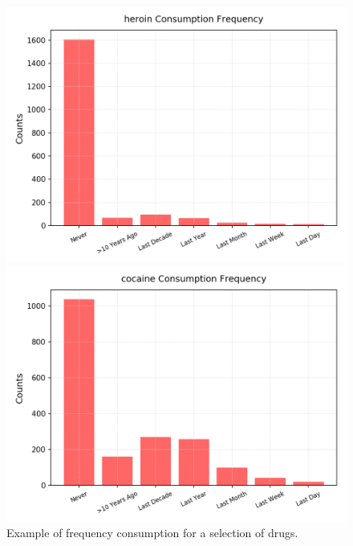 \documentclass{article}
\begin{document}
\begin{figure}[h!]
\begin{minipage}[b]{0.32\textwidth}
\end{minipage}
\begin{minipage}[b]{0.32\textwidth}
	\includegraphics[width=\textwidth]{plots/drugsPlots/heroin_freq.png}

\end{minipage}
\begin{minipage}[b]{0.32\textwidth}
	\includegraphics[width=\textwidth]{plots/drugsPlots/cocaine_freq.png}
\end{minipage}

	\caption{Example of frequency consumption for a selection of drugs.}
\label{drugs1}
\end{figure}
\end{document}
